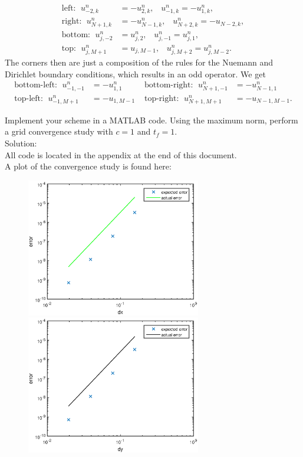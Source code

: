 \begin{align*}
\text{left: } \;u_{-2,k}^n&=-u_{2,k}^n,\;\;\; u_{-1,k}^n=-u_{1,k}^n,\\
\text{right: } \; u_{N+1,k}^n&=-u_{N-1,k}^n,\;\;\; u_{N+2,k}^n=-u_{N-2,k},\\
\text{bottom: } \; u_{j,-2}^n&=u_{j,2}^n,\;\;\; u_{j,-1}^n=u_{j,1}^n,\\
\text{top: } \; u_{j,M+1}^n&=u_{j,M-1},\;\;\; u_{j,M+2}^n=u_{j,M-2}^n.
\end{align*}
The corners then are just a composition of the rules for the Nuemann and Dirichlet boundary conditions, which results in an odd operator. We get
\begin{align*}
\text{bottom-left: }\;u_{-1,-1}^n&=-u_{1,1}^n & \text{ bottom-right: }\; u_{N+1,-1}^n&=-u_{N-1,1}^n\\
\text{top-left: }\;u_{-1,M+1}^n&=-u_{1,M-1} & \text{ top-right: }\; u_{N+1,M+1}^n&=-u_{N-1,M-1}.
\end{align*}


\item Implement your scheme in a MATLAB code. Using the maximum norm, perform a grid convergence study with $c=1$ and $t_f=1.$\\ 
Solution:\\

All code is located in the appendix at the end of this document.\\
A plot of the convergence study is found here:
\begin{figure}[h]
\centering
\includegraphics[width=3in]{mat_conv_study1}
\includegraphics[width=3in]{mat_conv_study}
\end{figure}


